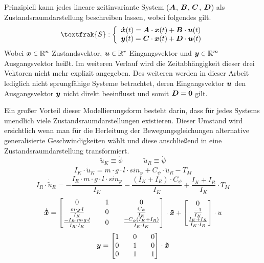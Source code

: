 Prinzipiell kann jedes lineare zeitinvariante System 
($\boldsymbol{A}$, $\boldsymbol{B}$, $\boldsymbol{C}$, $\boldsymbol{D}$) als Zustandsraumdarstellung beschreiben lassen, wobei folgendes gilt.
\begin{equation}
\textfrak{S} 
: \left\{ \begin{array}{ll}
\bs{\dot{x}}(t) = \bs{A}\cdot \bs{x}(t) + \bs{B}\cdot \bs{u}(t) \\
\bs{y}(t) = \bs{C}\cdot \bs{x}(t) + \bs{D}\cdot \bs{u}(t)
\end{array}
\right.
\end{equation}
Wobei $\boldsymbol{x} \in \mathbb{R}^n$ Zustandsvektor, $\boldsymbol{u} \in \mathbb{R}^r$ Eingangsvektor und $\boldsymbol{y} \in \mathbb{R}^m$ Ausgangsvektor heißt. Im weiteren Verlauf wird die Zeitabhängigkeit dieser drei Vektoren nicht mehr explizit angegeben. Des weiteren werden in dieser Arbeit lediglich nicht sprungfähige Systeme  betrachtet, deren Eingangsvektor $\boldsymbol{u}$  den Ausgangsvektor $\boldsymbol{y}$ nicht direkt beeinflusst und somit $\boldsymbol{D} = \boldsymbol{0}$ gilt.

Ein großer Vorteil dieser Modellierungsform besteht darin, dass für jedes Systems unendlich viele Zustandsraumdarstellungen existieren. Dieser Umstand wird ersichtlich wenn man für die Herleitung der Bewegungsgleichungen alternative generalisierte Geschwindigkeiten wählt und diese anschließend in eine Zustandsraumdarstellung transformiert.
\begin{equation}
\tilde{u}_K \equiv \dot{\phi} \hspace{35pt} \tilde{u}_R \equiv \dot{\psi}
\end{equation}
\begin{equation}
I_K\cdot \dot{\tilde{u}}_K = m\cdot g \cdot l \cdot sin_{\varphi} + C_{\psi}\cdot \tilde{u}_R - T_M
\end{equation}
\begin{equation}
I_R\cdot \dot{\tilde{u}}_R = -\frac{I_R\cdot m\cdot g\cdot l\cdot sin_{\varphi}}{I_K} - \frac{(I_K + I_R)\cdot C_{\psi}}{I_K} + \frac{I_K + I_R}{I_K}\cdot T_M
\end{equation}
\begin{equation}
\boldsymbol{\dot{\tilde{x}}} = \begin{bmatrix}
0 && 1 && 0 
\\
\frac{m\cdot g\cdot l}{I_K} && 0 && \frac{C_{\psi}}{I_K}
\\
\frac{-I_R\cdot m\cdot g\cdot l}{I_R\cdot I_K} && 0 && \frac{-C_{\psi}(I_K+I_R)}{I_R\cdot I_K} 
\end{bmatrix}\cdot \boldsymbol{\tilde{x}}
+
\begin{bmatrix}
0 \\ \frac{-1}{I_K} \\ \frac{I_K+I_R}{I_K\cdot I_R}
\end{bmatrix} \cdot u
\end{equation}
\begin{equation}
\boldsymbol{y} = \begin{bmatrix}
1 && 0 && 0 \\
0 && 1 && 0 \\
0 && 1 && 1 \\
\end{bmatrix} \cdot \boldsymbol{\tilde{x}}
\end{equation}

